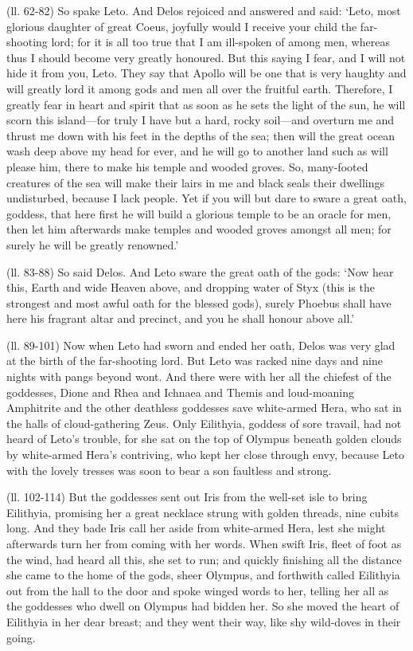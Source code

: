 (ll. 62-82) So spake Leto. And Delos rejoiced and answered and said:
‘Leto, most glorious daughter of great Coeus, joyfully would I receive
your child the far-shooting lord; for it is all too true that I am ill-spoken
of among men, whereas thus I should become very greatly honoured. But this
saying I fear, and I will not hide it from you, Leto. They say that Apollo will
be one that is very haughty and will greatly lord it among gods and men all
over the fruitful earth. Therefore, I greatly fear in heart and spirit that as
soon as he sets the light of the sun, he will scorn this island—for truly
I have but a hard, rocky soil—and overturn me and thrust me down with his
feet in the depths of the sea; then will the great ocean wash deep above my
head for ever, and he will go to another land such as will please him, there to
make his temple and wooded groves. So, many-footed creatures of the sea will
make their lairs in me and black seals their dwellings undisturbed, because I
lack people. Yet if you will but dare to sware a great oath, goddess, that here
first he will build a glorious temple to be an oracle for men, then let him
afterwards make temples and wooded groves amongst all men; for surely he will
be greatly renowned.’

(ll. 83-88) So said Delos. And Leto sware the great oath of the gods:
‘Now hear this, Earth and wide Heaven above, and dropping water of Styx
(this is the strongest and most awful oath for the blessed gods), surely
Phoebus shall have here his fragrant altar and precinct, and you he shall
honour above all.’

(ll. 89-101) Now when Leto had sworn and ended her oath, Delos was very glad at
the birth of the far-shooting lord. But Leto was racked nine days and nine
nights with pangs beyond wont. And there were with her all the chiefest of the
goddesses, Dione and Rhea and Ichnaea and Themis and loud-moaning Amphitrite
and the other deathless goddesses save white-armed Hera, who sat in the halls
of cloud-gathering Zeus. Only Eilithyia, goddess of sore travail, had not heard
of Leto’s trouble, for she sat on the top of Olympus beneath golden
clouds by white-armed Hera’s contriving, who kept her close through envy,
because Leto with the lovely tresses was soon to bear a son faultless and
strong.

(ll. 102-114) But the goddesses sent out Iris from the well-set isle to bring
Eilithyia, promising her a great necklace strung with golden threads, nine
cubits long. And they bade Iris call her aside from white-armed Hera, lest she
might afterwards turn her from coming with her words. When swift Iris, fleet of
foot as the wind, had heard all this, she set to run; and quickly finishing all
the distance she came to the home of the gods, sheer Olympus, and forthwith
called Eilithyia out from the hall to the door and spoke winged words to her,
telling her all as the goddesses who dwell on Olympus had bidden her. So she
moved the heart of Eilithyia in her dear breast; and they went their way, like
shy wild-doves in their going.

